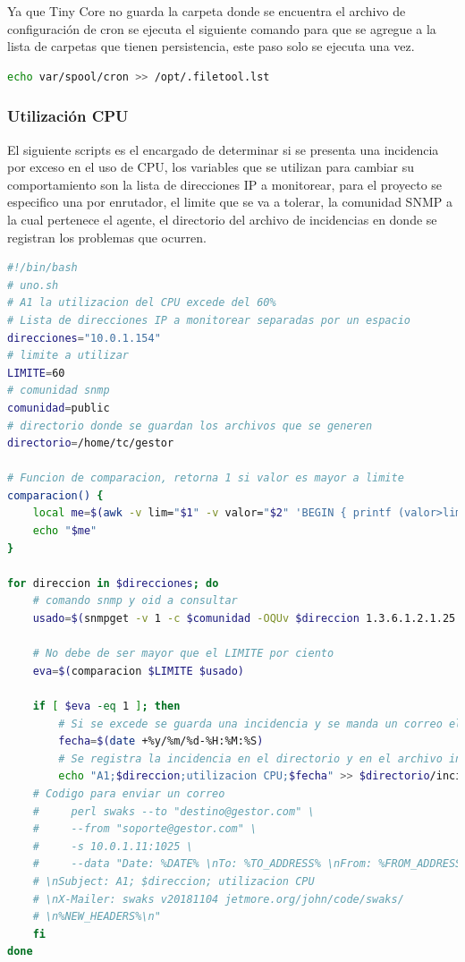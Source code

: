 \documentclass[12pt, titlepage]{article}
\begin{document}
Ya que Tiny Core no guarda la carpeta donde se encuentra el archivo de configuración de cron se ejecuta el siguiente comando para que se agregue a la lista de carpetas que tienen persistencia, este paso solo se ejecuta una vez.
\begin{lstlisting}[language=bash]
 echo var/spool/cron >> /opt/.filetool.lst
\end{lstlisting}


\subsubsection{Utilización CPU}
El siguiente scripts es el encargado de determinar si se presenta una incidencia por exceso en el uso de CPU, los variables que se utilizan para cambiar su comportamiento son la lista de direcciones IP a monitorear, para el proyecto se especifico una por enrutador, el limite que se va a tolerar, la comunidad SNMP a la cual pertenece el agente, el directorio del archivo de incidencias en donde se registran los problemas que ocurren.
\begin{lstlisting}[language=bash]
 #!/bin/bash
# uno.sh
# A1 la utilizacion del CPU excede del 60%
# Lista de direcciones IP a monitorear separadas por un espacio
direcciones="10.0.1.154"
# limite a utilizar
LIMITE=60
# comunidad snmp
comunidad=public
# directorio donde se guardan los archivos que se generen
directorio=/home/tc/gestor

# Funcion de comparacion, retorna 1 si valor es mayor a limite
comparacion() {
    local me=$(awk -v lim="$1" -v valor="$2" 'BEGIN { printf (valor>lim?1:0) }')
    echo "$me"
}

for direccion in $direcciones; do
    # comando snmp y oid a consultar
    usado=$(snmpget -v 1 -c $comunidad -OQUv $direccion 1.3.6.1.2.1.25.3.3.1.2.768)

    # No debe de ser mayor que el LIMITE por ciento
    eva=$(comparacion $LIMITE $usado)

    if [ $eva -eq 1 ]; then
        # Si se excede se guarda una incidencia y se manda un correo electronico
        fecha=$(date +%y/%m/%d-%H:%M:%S)
        # Se registra la incidencia en el directorio y en el archivo incidencias
        echo "A1;$direccion;utilizacion CPU;$fecha" >> $directorio/incidencias.log
    # Codigo para enviar un correo
    #     perl swaks --to "destino@gestor.com" \
    #     --from "soporte@gestor.com" \
    #     -s 10.0.1.11:1025 \
    #     --data "Date: %DATE% \nTo: %TO_ADDRESS% \nFrom: %FROM_ADDRESS% 
    # \nSubject: A1; $direccion; utilizacion CPU 
    # \nX-Mailer: swaks v20181104 jetmore.org/john/code/swaks/
    # \n%NEW_HEADERS%\n"
    fi
done
\end{lstlisting}
\end{document}

